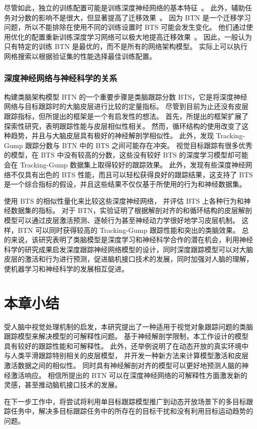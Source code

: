 尽管如此，独立的训练配置可能是训练深度神经网络的基本特征~\cite{Kornblith2018a}。
此外，辅助任务对分数的影响不是很大，但显著提高了迁移效果~\cite{Kornblith2018a}。
因为 BTN 是一个迁移学习问题，所以不能排除在使用不同的训练设置时 BTS 可能会发生变化。
他们通过使用优化的配置重新训练深度学习网络可以极大地提高迁移效果~\cite{Kornblith2018a}。
因此，一般认为只有特定的训练 BTN 是最优的，而不是所有的网络架构模型。
实际上可以执行网格搜索以根据验证集的性能选择最佳训练配置。

\subsubsection{深度神经网络与神经科学的关系}

构建类脑架构模型 BTN 的一个重要步骤是类脑跟踪分数 BTS，它是将深度神经网络与目标跟踪时的大脑皮层进行比较的定量指标。
尽管到目前为止还没有皮层跟踪指标，但所提出的框架是一个有启发性的想法。
首先，所提出的框架扩展了探索性研究，表明跟踪性能与皮层相似性相关。
然而，循环结构的使用改变了这种趋势，并且与大脑皮层具有极好的神经解剖学相似性。
此外，发现 Tracking-Gump 跟踪分数与 BTN 中的 BTS 之间可能存在冲突。
视觉目标跟踪有很多优秀的模型，在 BTS 中没有较高的分数，这些没有较好 BTS 的深度学习模型却可能会在 Tracking-Gump 数据集上取得较好的跟踪效果。
此外，发现有些深度神经网络不仅具有出色的 BTS 性能，而且可以轻松获得良好的跟踪结果，这支持了 BTS 是一个综合指标的假设，并且这些结果不仅仅基于所使用的行为和神经数据集。


使用 BTS 的相似性量化来比较这些深度神经网络，
并评估 BTS 上各种行为和神经数据集的指标。
对于 BTN，实验证明了根据解剖对齐的和循环结构的皮层解剖模型可以通过皮层激活预测、逐帧行为甚至神经动力学很好地学习皮层机制。
这样，BTN 可以同时获得较高的 Tracking-Gump 跟踪性能和突出的类脑效果。
总的来说，该研究表明了类脑模型是深度学习和神经科学合作的潜在机会，利用神经科学的研究成果启发深度跟踪神经网络模型的设计，同时深度跟踪模型可以对大脑皮层的激活和行为进行预测，促进脑机接口技术的发展，同时加强对人脑的理解，使机器学习和神经科学的发展相互促进。




\section{本章小结}
受人脑中视觉处理机制的启发，本研究提出了一种适用于视觉对象跟踪问题的类脑跟踪模型来解决模型的可解释性问题。
基于神经解剖学限制，本工作设计的模型具有较好的跟踪性能和可解释性。
此外，还举例说明了在动态开放的真实环境中与人类平滑跟踪特别相关的皮层模型，
并开发一种新方法来计算模型激活和皮层激活数据之间的相似性。
同时具有神经解剖对齐的模型可以更好地预测人脑的神经激活响应。
相信所提出的 BTN 可以在深度神经网络的可解释性方面激发新的灵感，甚至推动脑机接口技术的发展。

在下一步工作中，将尝试将利用单目标跟踪模型推广到动态开放场景下的多目标跟踪任务中，解决多目标跟踪任务中的所存在的目标干扰和没有利用目标运动趋势的问题。

